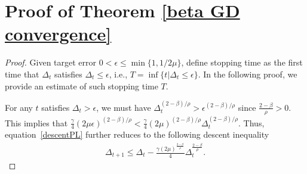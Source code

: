\documentclass[10pt]{article} %
\def\eqref#1{equation~\ref{#1}}
\newtheorem{proof}{Proof}
\begin{document}
\section{Proof of Theorem \ref{beta GD convergence}}\label{Appendix E}
\mainthmone*
\begin{proof}\label{Proof of beta GD convergence}
Given target error $0< \epsilon \leq \min \{ 1,1/{2\mu}\}$,
define stopping time as the first time that $\Delta_t$ satisfies $\Delta_t\leq \epsilon$, i.e., $
T= \inf \{t | \Delta_t \leq \epsilon \}$. In the following proof, we provide an estimate of such stopping time $T$.


For any $t$ satisfies $\Delta_t > \epsilon$, we must have
$\Delta_t^{(2-\beta)/{\rho}}>\epsilon^{(2-\beta)/{\rho}}$ since $\frac{2-\beta}{\rho}>0$. This implies that  $\frac{\gamma}{4}(2\mu\epsilon)^{(2-\beta)/{\rho}}<\frac{\gamma}{4}(2\mu)^{(2-\beta)/{\rho}}\Delta_t^{(2-\beta)/{\rho}}$. Thus, \eqref{descentPL} further reduces to
the following descent inequality
\begin{align}
\Delta_{t+1} \leq \Delta_t - \frac{\gamma (2\mu)^{\frac{2-\beta}{\rho}}}{4} \Delta_t^{\frac{2-\beta}{\rho}}. 
\label{descentPL2}
\end{align}





\end{proof}
\end{document}
